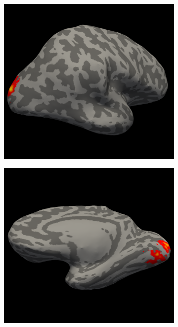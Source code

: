 \documentclass[5p,authoryear]{elsarticle}
\begin{document}
\begin{figure}
\begin{subfigure}{0.2\textwidth}
\caption{}
\label{fig:s2-rh-medial-sensitivity}
\end{subfigure}
\begin{subfigure}{0.2\textwidth}
\centering
\includegraphics[width=\textwidth]{figures/s2-rh-lateral-zscore}
\caption{}
\label{fig:s2-rh-lateral-zscore}
\end{subfigure}
\begin{subfigure}{0.2\textwidth}
\centering
\includegraphics[width=\textwidth]{figures/s2-rh-medial-zscore}

\end{subfigure}
\end{figure}
\end{document}
